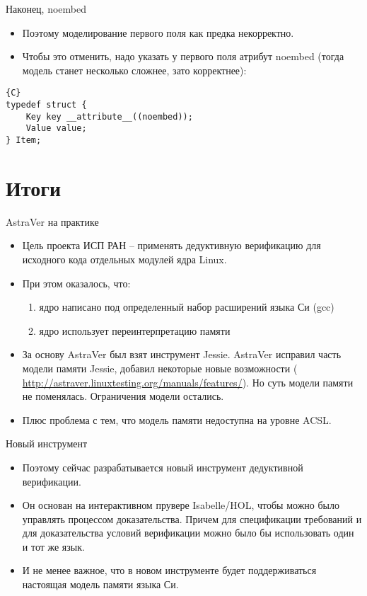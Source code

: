 \documentclass[hyperref={unicode=true}]{beamer}
\begin{document}
    \begin{frame}[fragile]{Наконец, noembed}
    \begin{itemize}
    \item
    Поэтому моделирование первого поля как предка некорректно.
    \item
    Чтобы это отменить, надо указать у первого поля атрибут
    noembed (тогда модель станет несколько сложнее, зато
    корректнее):
    \end{itemize}

    \begin{lstlisting}{C}
typedef struct {
    Key key __attribute__((noembed));
    Value value;
} Item;
    \end{lstlisting}
    \end{frame}

    \section{Итоги}

    \begin{frame}{AstraVer на практике}
    \begin{itemize}
    \item
    Цель проекта ИСП РАН -- применять дедуктивную
    верификацию для исходного кода отдельных модулей
    ядра Linux.
    \item
    При этом оказалось, что:
        \begin{enumerate}
        \item
        ядро написано под определенный набор расширений
        языка Си (gcc)
        \item
        ядро использует переинтерпретацию памяти
        \end{enumerate}
    \item
    За основу AstraVer был взят инструмент Jessie. AstraVer
    исправил часть модели памяти Jessie, добавил некоторые
    новые возможности (
    \url{http://astraver.linuxtesting.org/manuals/features/}).
    Но суть модели памяти не поменялась. Ограничения модели
    остались.
    \item
    Плюс проблема с тем, что модель памяти недоступна на
    уровне ACSL.
    \end{itemize}
    \end{frame}

    \begin{frame}{Новый инструмент}
    \begin{itemize}
    \item
    Поэтому сейчас разрабатывается новый инструмент
    дедуктивной верификации.
    \item
    Он основан на интерактивном прувере Isabelle/HOL,
    чтобы можно было управлять процессом доказательства.
    Причем для спецификации требований и для доказательства
    условий верификации можно было бы использовать
    один и тот же язык.
    \item
    И не менее важное, что в новом инструменте будет
    поддерживаться настоящая модель памяти языка Си.
    \end{itemize}
    \end{frame}
\end{document}
